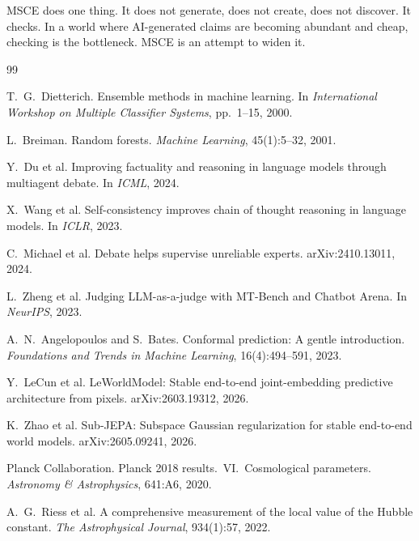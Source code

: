 \documentclass[11pt,a4paper]{article}
\begin{document}
MSCE does one thing. It does not generate, does not create, does not discover. It checks. In a world where AI-generated claims are becoming abundant and cheap, checking is the bottleneck. MSCE is an attempt to widen it.

\begin{thebibliography}{99}

T.~G.~Dietterich.
\newblock Ensemble methods in machine learning.
\newblock In \emph{International Workshop on Multiple Classifier Systems}, pp.\ 1--15, 2000.

L.~Breiman.
\newblock Random forests.
\newblock \emph{Machine Learning}, 45(1):5--32, 2001.

Y.~Du et al.
\newblock Improving factuality and reasoning in language models through multiagent debate.
\newblock In \emph{ICML}, 2024.

X.~Wang et al.
\newblock Self-consistency improves chain of thought reasoning in language models.
\newblock In \emph{ICLR}, 2023.

C.~Michael et al.
\newblock Debate helps supervise unreliable experts.
\newblock arXiv:2410.13011, 2024.

L.~Zheng et al.
\newblock Judging LLM-as-a-judge with MT-Bench and Chatbot Arena.
\newblock In \emph{NeurIPS}, 2023.

A.~N.~Angelopoulos and S.~Bates.
\newblock Conformal prediction: A gentle introduction.
\newblock \emph{Foundations and Trends in Machine Learning}, 16(4):494--591, 2023.

Y.~LeCun et al.
\newblock LeWorldModel: Stable end-to-end joint-embedding predictive architecture from pixels.
\newblock arXiv:2603.19312, 2026.

K.~Zhao et al.
\newblock Sub-JEPA: Subspace Gaussian regularization for stable end-to-end world models.
\newblock arXiv:2605.09241, 2026.

Planck Collaboration.
\newblock Planck 2018 results.\ VI.\ Cosmological parameters.
\newblock \emph{Astronomy \& Astrophysics}, 641:A6, 2020.

A.~G.~Riess et al.
\newblock A comprehensive measurement of the local value of the Hubble constant.
\newblock \emph{The Astrophysical Journal}, 934(1):57, 2022.

\end{thebibliography}
\end{document}
